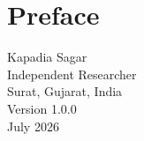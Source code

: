 \section*{Preface}

\vspace{1cm}

\begin{flushright}
	Kapadia Sagar\\
	Independent Researcher\\
	Surat, Gujarat, India\\
	Version 1.0.0\\
	July 2026
\end{flushright}